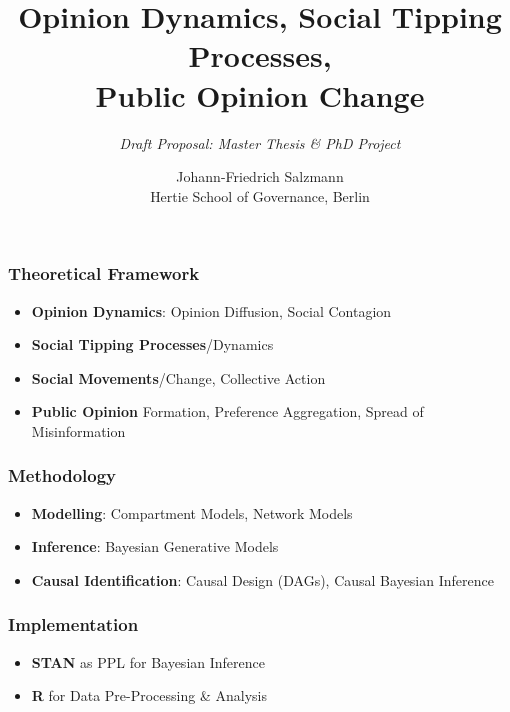 \documentclass[
  12pt,
]{article}
\title{Opinion Dynamics, Social Tipping Processes,\\
Public Opinion Change}
\subtitle{\emph{Draft Proposal: Master Thesis \& PhD Project}}
\author{Johann-Friedrich Salzmann
\href{mailto:mail@jfsalzmann.com}{\Letter}\\
\footnotesize Hertie School of Governance, Berlin}
\date{}
\providecommand{\tightlist}{%
  \setlength{\itemsep}{0pt}\setlength{\parskip}{0pt}}
\numberwithin{equation}{section}
\numberwithin{table}{section}
\numberwithin{figure}{section}
\begin{document}
\maketitle

\renewcommand{\harvardand}{\&}

\nocite{Bak-Coleman2022,Chatzilena2019,Sooknanan2016,Winkelmann2022}

\hypertarget{theoretical-framework}{%
\subsubsection{Theoretical Framework}\label{theoretical-framework}}

\begin{itemize}
\tightlist
\item
  \textbf{Opinion Dynamics}: Opinion Diffusion, Social Contagion
\item
  \textbf{Social Tipping Processes}/Dynamics
\item
  \textbf{Social Movements}/Change, Collective Action
\item
  \textbf{Public Opinion} Formation, Preference Aggregation, Spread of
  Misinformation
\end{itemize}

\hypertarget{methodology}{%
\subsubsection{Methodology}\label{methodology}}

\begin{itemize}
\tightlist
\item
  \textbf{Modelling}: Compartment Models, Network Models
\item
  \textbf{Inference}: Bayesian Generative Models
\item
  \textbf{Causal Identification}: Causal Design (DAGs), Causal Bayesian
  Inference
\end{itemize}

\hypertarget{implementation}{%
\subsubsection{Implementation}\label{implementation}}

\begin{itemize}
\tightlist
\item
  \textbf{STAN} as PPL for Bayesian Inference
\item
  \textbf{R} for Data Pre-Processing \& Analysis
\end{itemize}
\end{document}
